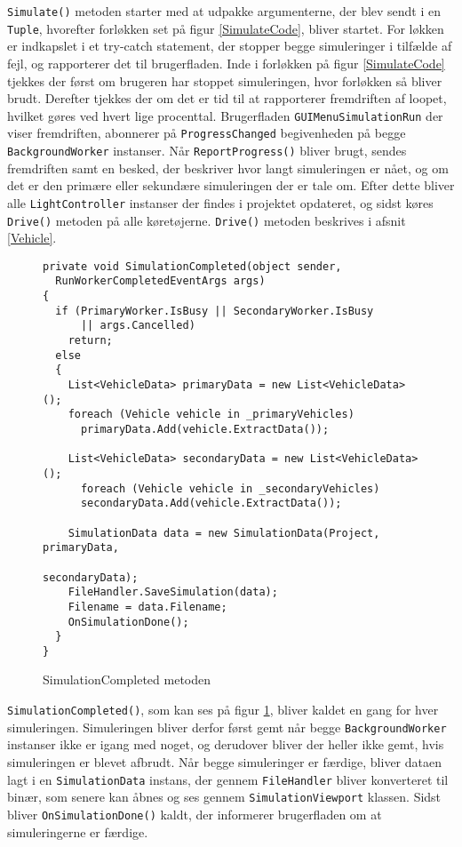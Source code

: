 \texttt{Simulate()} metoden starter med at udpakke argumenterne, der blev sendt i en \texttt{Tuple}, hvorefter forløkken set på figur \ref{SimulateCode}, bliver startet. For løkken er indkapslet i et try-catch statement, der stopper begge simuleringer i tilfælde af fejl, og rapporterer det til brugerfladen. Inde i forløkken på figur \ref{SimulateCode} tjekkes der først om brugeren har stoppet simuleringen, hvor forløkken så bliver brudt. Derefter tjekkes der om det er tid til at rapporterer fremdriften af loopet, hvilket gøres ved hvert lige procenttal. Brugerfladen \texttt{GUIMenuSimulationRun} der viser fremdriften, abonnerer på \texttt{ProgressChanged} begivenheden på begge \texttt{BackgroundWorker} instanser. Når \texttt{ReportProgress()} bliver brugt, sendes fremdriften samt en besked, der beskriver hvor langt simuleringen er nået, og om det er den primære eller sekundære simuleringen der er tale om. Efter dette bliver alle \texttt{LightController} instanser der findes i projektet opdateret, og sidst køres \texttt{Drive()} metoden på alle køretøjerne. \texttt{Drive()} metoden beskrives i afsnit \ref{Vehicle}.

\begin{figure}[H]
\begin{lstlisting}
private void SimulationCompleted(object sender, 
  RunWorkerCompletedEventArgs args)
{
  if (PrimaryWorker.IsBusy || SecondaryWorker.IsBusy 
      || args.Cancelled)
    return;
  else
  {
    List<VehicleData> primaryData = new List<VehicleData>();
    foreach (Vehicle vehicle in _primaryVehicles)
      primaryData.Add(vehicle.ExtractData());

    List<VehicleData> secondaryData = new List<VehicleData>();
      foreach (Vehicle vehicle in _secondaryVehicles)
      secondaryData.Add(vehicle.ExtractData());

    SimulationData data = new SimulationData(Project, primaryData, 
                                             secondaryData);
    FileHandler.SaveSimulation(data);
    Filename = data.Filename;
    OnSimulationDone();
  }
}
\end{lstlisting}
\caption{SimulationCompleted metoden}\label{SimulationCompletedCode}
\end{figure}

\texttt{SimulationCompleted()}, som kan ses på figur \ref{SimulationCompletedCode}, bliver kaldet en gang for hver simuleringen. Simuleringen bliver derfor først gemt når begge \texttt{BackgroundWorker} instanser ikke er igang med noget, og derudover bliver der heller ikke gemt, hvis simuleringen er blevet afbrudt. Når begge simuleringer er færdige, bliver dataen lagt i en \texttt{SimulationData} instans, der gennem \texttt{FileHandler} bliver konverteret til binær, som senere kan åbnes og ses gennem \texttt{SimulationViewport} klassen. Sidst bliver \texttt{OnSimulationDone()} kaldt, der informerer brugerfladen om at simuleringerne er færdige.